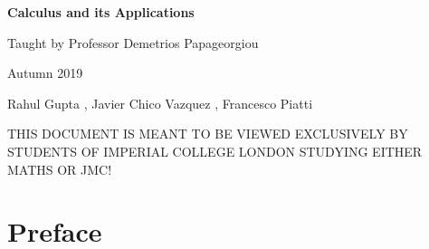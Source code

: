 \documentclass{book}
\begin{document}
\begin{titlepage}
\centering
\vspace{5cm}
{\LARGE\bfseries Calculus and its Applications}

\vspace{1cm}

{\Large Taught by Professor Demetrios Papageorgiou}

\vspace{2cm}

{\Large Autumn 2019}

\vspace{2cm}

{\large Rahul Gupta , Javier Chico Vazquez , Francesco Piatti}

\vspace{5cm}

{\large THIS DOCUMENT IS MEANT TO BE VIEWED EXCLUSIVELY BY STUDENTS OF IMPERIAL COLLEGE LONDON STUDYING EITHER MATHS OR JMC!}

\end{titlepage}


\newpage
\tableofcontents{}
\newpage


\chapter{Preface}
\end{document}
